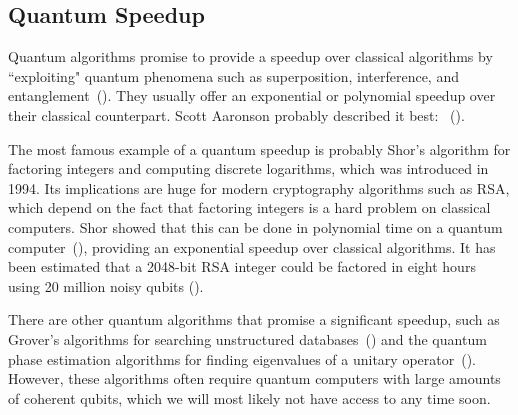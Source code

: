 \documentclass[a4paper,10pt]{article}
\begin{document}
\subsection{Quantum Speedup}
Quantum algorithms promise to provide a speedup over classical algorithms by ``exploiting" quantum phenomena such as superposition, interference, and entanglement~(\cite{nielsen-chuang}).
They usually offer an exponential or polynomial speedup over their classical counterpart.
Scott Aaronson probably described it best:
~(\cite{scott-aaronson-qc}).

The most famous example of a quantum speedup is probably Shor's algorithm for factoring integers and computing discrete logarithms, which was introduced in 1994.
Its implications are huge for modern cryptography algorithms such as RSA, which depend on the fact that factoring integers is a hard problem on classical computers.
Shor showed that this can be done in polynomial time on a quantum computer~(\cite{shor-factoring}), providing an exponential speedup over classical algorithms. 
It has been estimated that a 2048-bit RSA integer could be factored in eight hours using 20 million noisy qubits (\cite{shor-20mil}).

There are other quantum algorithms that promise a significant speedup, such as Grover's algorithms for searching unstructured databases~(\cite{grover-search}) and the quantum phase estimation algorithms for finding eigenvalues of a unitary operator~(\cite{nielsen-chuang}).
However, these algorithms often require quantum computers with large amounts of coherent qubits, which we will most likely not have access to any time soon.
\end{document}

